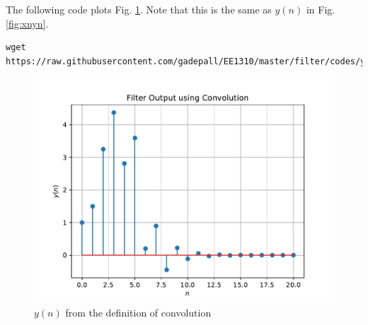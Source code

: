\documentclass[journal,12pt,twocolumn]{IEEEtran}
\renewcommand\thesection{\arabic{section}}
\begin{document}
\begin{enumerate}[label=\thesection.\arabic*]
		\solution The following code plots Fig. \ref{fig:ynconv}. Note that this is the same as 
		$y(n)$ in  Fig. 
		\ref{fig:xnyn}. 
		\begin{lstlisting}
wget https://raw.githubusercontent.com/gadepall/EE1310/master/filter/codes/ynconv.py
		\end{lstlisting}
		\begin{figure}[!ht]
			\centering
			\includegraphics[width=\columnwidth]{./figs/ynconv}
			\caption{$y(n)$ from the definition of convolution}
			\label{fig:ynconv}
		\end{figure}
	

\end{enumerate}
\end{document}
